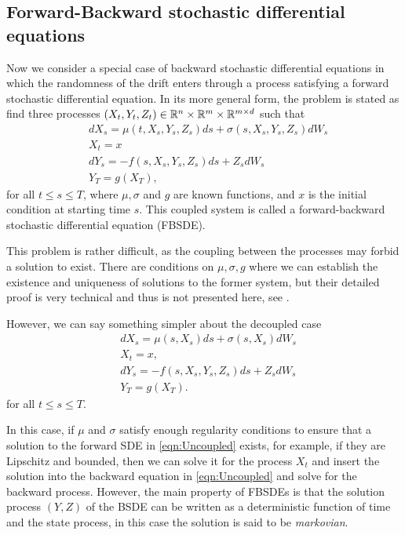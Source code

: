\subsection{Forward-Backward stochastic differential equations}
Now we consider a special case of backward stochastic differential equations in which the randomness of the drift enters through a process satisfying a forward stochastic differential equation. In its more general form, the problem is stated as find three processes  $(X_t,Y_t,Z_t)\in\mathbb{R}^n\times\mathbb{R}^m\times\mathbb{R}^{m\times d}$ such that
\begin{equation}
	\begin{split}
		&dX_s=\mu(t,X_s,Y_s,Z_s)ds+\sigma(s,X_s,Y_s,Z_s)dW_s\\
		&X_t=x\\
		&dY_s=-f(s,X_s,Y_s,Z_s)ds+Z_s dW_s\\
		&Y_T=g(X_T),
	\end{split}
\end{equation}  
for all $t\leq s \leq T$, where $\mu,\sigma$ and $g$ are known functions, and $x$ is the initial condition at starting time $s$. This coupled system is called a forward-backward stochastic differential equation (FBSDE).

This problem is rather difficult, as the coupling between the processes may forbid a solution to exist. There are conditions on $\mu, \sigma,g$ where we can establish the existence and uniqueness of solutions to the former system, but their detailed proof is very technical and thus is not presented here, see \cite{zhang_backward_2017}.

However, we can say something simpler about the decoupled case   
\begin{equation}
	\label{eqn:Uncoupled}
	\begin{split}
		&dX_s=\mu(s,X_s)ds+\sigma(s,X_s)dW_s\\
		&X_t=x,\\
		&dY_s=-f(s,X_s,Y_s,Z_s)ds+Z_s dW_s\\
		&Y_T=g(X_T).
	\end{split}
\end{equation}
for all $t\leq s\leq T$.  

In this case, if $\mu$ and $\sigma$ satisfy enough regularity conditions to ensure that a solution to the forward SDE in \eqref{eqn:Uncoupled} exists, for example, if they are Lipschitz and bounded, then we can solve it for the process $X_t$ and insert the solution into the backward equation in \ref{eqn:Uncoupled} and solve for the backward process. However, the main property of FBSDEs is that the solution process $(Y,Z)$ of the BSDE can be written as a deterministic function of time and the state process, in this case the solution is said to be \textit{markovian}. 

